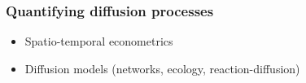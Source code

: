 \subsubsection{Quantifying diffusion processes}

\begin{itemize}
	\item Spatio-temporal econometrics
	\item Diffusion models (networks, ecology, reaction-diffusion)
\end{itemize}















